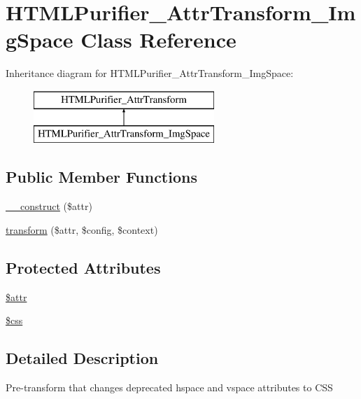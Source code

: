 \hypertarget{classHTMLPurifier__AttrTransform__ImgSpace}{\section{H\+T\+M\+L\+Purifier\+\_\+\+Attr\+Transform\+\_\+\+Img\+Space Class Reference}
\label{classHTMLPurifier__AttrTransform__ImgSpace}
}
Inheritance diagram for H\+T\+M\+L\+Purifier\+\_\+\+Attr\+Transform\+\_\+\+Img\+Space\+:\begin{figure}[H]
\begin{center}
\leavevmode
\includegraphics[height=2.000000cm]{classHTMLPurifier__AttrTransform__ImgSpace}
\end{center}
\end{figure}
\subsection*{Public Member Functions}
\begin{DoxyCompactItemize}
\item 
\hyperlink{classHTMLPurifier__AttrTransform__ImgSpace_a2623ffe5af19a7b07cc6821fde8d1791}{\+\_\+\+\_\+construct} (\$attr)
\item 
\hyperlink{classHTMLPurifier__AttrTransform__ImgSpace_adc9a14414607393a5c9b438e688a60e2}{transform} (\$attr, \$config, \$context)
\end{DoxyCompactItemize}
\subsection*{Protected Attributes}
\begin{DoxyCompactItemize}
\item 
\hyperlink{classHTMLPurifier__AttrTransform__ImgSpace_a6bbabae9f08859c1bde6afea203650bd}{\$attr}
\item 
\hyperlink{classHTMLPurifier__AttrTransform__ImgSpace_a20d57cb323becdfd30f98b56fc7dc643}{\$css}
\end{DoxyCompactItemize}


\subsection{Detailed Description}
Pre-\/transform that changes deprecated hspace and vspace attributes to C\+S\+S 

